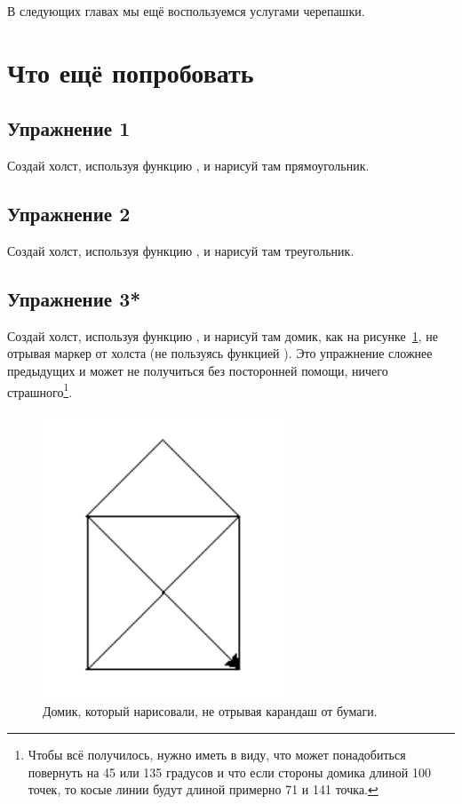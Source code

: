 В следующих главах мы ещё воспользуемся услугами черепашки.

\section{Что ещё попробовать}


\subsection*{Упражнение 1}
Создай холст, используя функцию , и нарисуй там прямоугольник.

\subsection*{Упражнение 2}
Создай холст, используя функцию , и нарисуй там треугольник.

\subsection*{Упражнение 3*}
Создай холст, используя функцию , и нарисуй там домик, как на рисунке \ref{fighouse}, не отрывая маркер от холста (не пользуясь функцией ). Это упражнение сложнее предыдущих и может не получиться без посторонней помощи, ничего страшного\footnote{Чтобы всё получилось, нужно иметь в виду, что может понадобиться повернуть на 45 или 135 градусов и что если стороны домика длиной 100 точек, то косые линии будут длиной примерно 71 и 141 точка.}.

\begin{figure}
\begin{center}
\includegraphics[width=72mm]{03.house.png}
\end{center}
\caption{Домик, который нарисовали, не отрывая карандаш от бумаги.}\label{fighouse}
\end{figure}

\newpage
